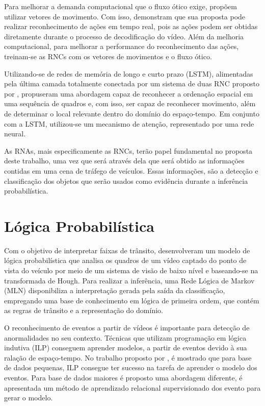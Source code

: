 \documentclass[
	12pt,				%
    oneside,			%
	a4paper,			%
	english,			%
	french,				%
	spanish,			%
	brazil,				%
	]{abntex2}
\begin{document}
Para melhorar a demanda computacional que o fluxo ótico exige,  propõem utilizar vetores de movimento. Com isso, demonstram que sua proposta pode realizar reconhecimento de ações em tempo real, pois as ações podem ser obtidas diretamente durante o processo de decodificação do vídeo. Além da melhoria computacional, para melhorar a performance do reconhecimento das ações, treinam-se as RNCs com os vetores de movimentos e o fluxo ótico.

Utilizando-se de redes de memória de longo e curto prazo (LSTM), alimentadas pela última camada totalmente conectada por um sistema de duas RNC proposto por ,  propuseram uma abordagem capaz de reconhecer a ordenação espacial em uma sequência de quadros  e, com isso, ser capaz de reconhecer movimento, além de determinar o local relevante dentro do domínio do espaço-tempo. Em conjunto com a LSTM, utilizou-se um mecanismo de atenção, representado por uma rede neural.

As RNAs, mais especificamente as RNCs, terão papel fundamental no proposta deste trabalho, uma vez que será através dela que será obtido as informações contidas em uma cena de tráfego de veículos. Essas informações, são a detecção e classificação dos objetos que serão usados como evidência durante a inferência probabilística.

\section {Lógica Probabilística}

Com o objetivo de interpretar faixas de trânsito,  desenvolveram um modelo de lógica probabilística que analisa os quadros de um vídeo captado do ponto de vista do veículo por meio de um sistema de visão de baixo nível e baseando-se na transformada de Hough. Para realizar a inferência, uma Rede Lógica de Markov (MLN) disponibiliza a interpretação gerada pela saída da classificação, empregando uma base de conhecimento em lógica de primeira ordem, que contém as regras de trânsito e a representação do domínio. 

O reconhecimento de eventos a partir de vídeos é importante para detecção de anormalidades no seu contexto. Técnicas que utilizam programação em lógica indutiva (ILP) conseguem aprender modelos, a partir de eventos devido à sua ralação de espaço-tempo. No trabalho proposto por , é mostrado que para base de dados pequenas, ILP consegue ter sucesso na tarefa de aprender o modelo dos eventos. Para base de dados maiores é proposto uma abordagem diferente, é apresentada um método de aprendizado relacional supervisionado dos evento para gerar o modelo.
\end{document}

